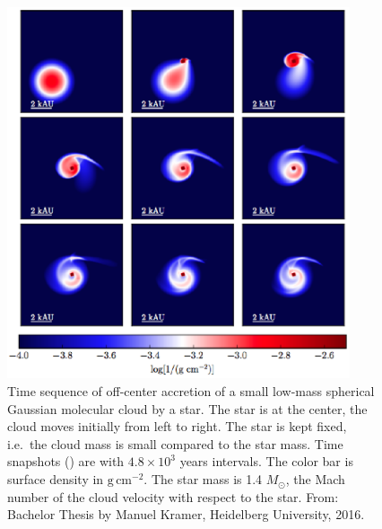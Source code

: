 \documentclass[10pt,fleqn,twoside]{article}
\begin{document}
\begin{figure}
\centerline{\includegraphics[width=0.9\textwidth]{D2Fig/Kramer_Fig4.1.eps}}
\caption{\label{fig-kramer-4.1}Time sequence of off-center accretion of a
  small low-mass spherical Gaussian molecular cloud by a star. The star is
  at the center, the cloud moves initially from left to right. The star is
  kept fixed, i.e.~the cloud mass is small compared to the star mass. Time
  snapshots () are with
  $4.8\times 10^3$ years intervals. The color bar is surface density in
  $\mathrm{g}\,\mathrm{cm}^{-2}$. The star mass is 1.4 $M_{\odot}$, the Mach
  number of the cloud velocity with respect to the star. From: Bachelor
  Thesis by Manuel Kramer, Heidelberg University, 2016.}
\end{figure}
\end{document}
